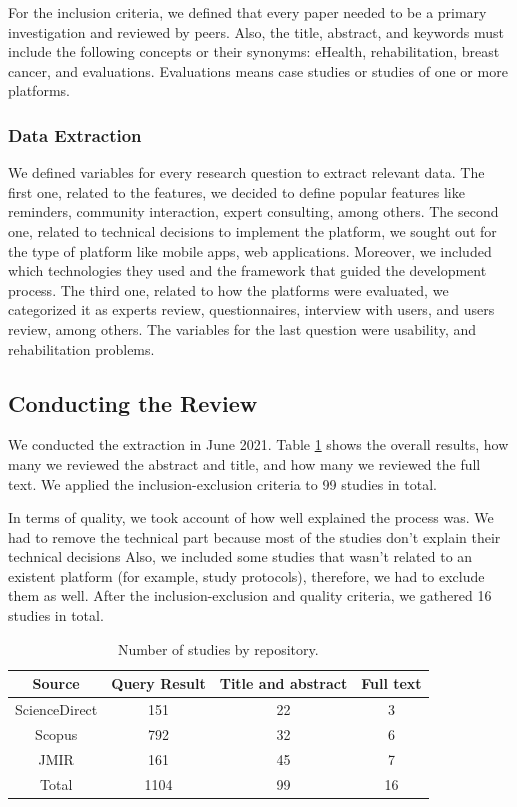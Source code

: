 \documentclass[conference]{IEEEtran}
\begin{document}
For the inclusion criteria, we defined that every paper needed to be a primary investigation and reviewed by peers. Also, the title, abstract, and keywords must include the following concepts or their synonyms: eHealth, rehabilitation, breast cancer, and evaluations. Evaluations means case studies or studies of one or more platforms.

\subsubsection{Data Extraction}
We defined variables for every research question to extract relevant data. The first one, related to the features, we decided to define popular features like reminders, community interaction, expert consulting, among others. The second one, related to technical decisions to implement the platform, we sought out for the type of platform like mobile apps, web applications. Moreover, we included which technologies they used and the framework that guided the development process. The third one, related to how the platforms were evaluated, we categorized it as experts review, questionnaires, interview with users, and users review, among others. The variables for the last question were usability, and rehabilitation problems.

\subsection{Conducting the Review}
\label{section:conducting_review}

We conducted the extraction in June 2021. Table \ref{table:review_results} shows the overall results, how many we reviewed the abstract and title, and how many we reviewed the full text. We applied the inclusion-exclusion criteria to 99 studies in total.

In terms of quality, we took account of how well explained the process was. We had to remove the technical part because most of the studies don't explain their technical decisions Also, we included some studies that wasn't related to an existent platform (for example, study protocols), therefore, we had to exclude them as well. After the inclusion-exclusion and quality criteria, we gathered 16 studies in total.

\begin{table}[h!]
\centering
\begin{tabular}{||c c c c ||} 
\hline
Source & Query Result & Title and abstract & Full text \\
\hline\hline
ScienceDirect & 151 & 22 & 3 \\ 
Scopus & 792 & 32 & 6 \\ 
JMIR & 161 & 45 & 7 \\ 
Total & 1104 & 99 & 16 \\
\hline
\end{tabular} \\ [1ex] 
\caption{Number of studies by repository.}
\label{table:review_results}
\end{table}
\end{document}
